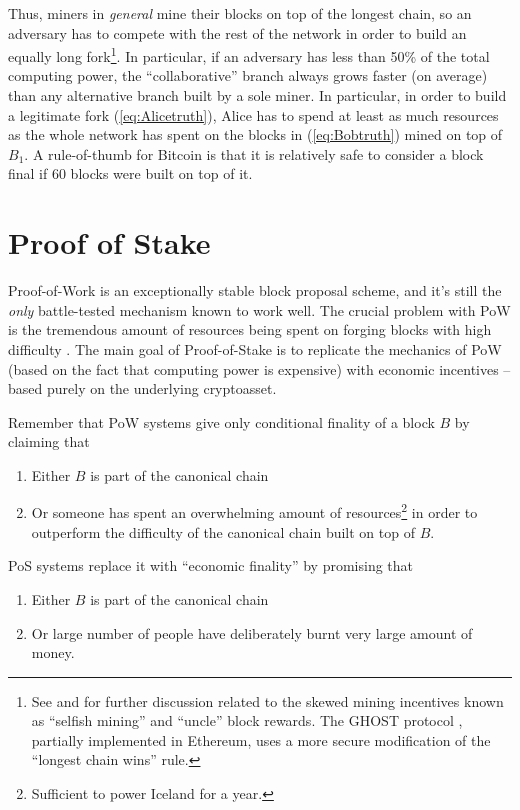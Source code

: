 \documentclass[a4paper]{article}
\begin{document}
 Thus, miners in \emph{general} mine their blocks on top of the longest chain, so an adversary has to compete with the rest of the network in order to build an equally long fork\footnote{See \cite{Eyal_Sirer_2018} and \cite{ButerinSecurityFrameworks} for further discussion related to the skewed mining incentives known as ``selfish mining'' and ``uncle'' block rewards. The GHOST protocol \cite{GHOST}, partially implemented in Ethereum, uses a more secure modification of the ``longest chain wins'' rule.}. In particular, if an adversary has less than 50\% of the total computing power, the ``collaborative'' branch always grows faster (on average) than any alternative branch built by a sole miner. In particular, in order to build a legitimate fork (\ref{eq:Alicetruth}), Alice has to spend at least as much resources as the whole network has spent on the blocks in (\ref{eq:Bobtruth}) mined on top of $B_1$. A rule-of-thumb for Bitcoin is that it is relatively safe to consider a block final if 60 blocks were built on top of it\cite{BitcoinConfirmation}.  
 
\section{Proof of Stake} \label{sec:PoS}

Proof-of-Work is an exceptionally stable block proposal scheme, and it's still the \emph{only} battle-tested mechanism known to work well. The crucial problem with PoW is the tremendous amount of resources being spent on forging blocks with high difficulty \cite{BitcoinEnergy}.    
   The main goal of Proof-of-Stake is to replicate the mechanics of PoW (based on the fact that computing power is expensive) with economic incentives -- based purely on the underlying cryptoasset.
 
  Remember that PoW systems give only conditional finality of a block $B$ by claiming that 
 \begin{enumerate}
    \item[(1)] Either $B$ is part of the canonical chain
    \item[(2)] Or someone has spent an overwhelming amount of resources\footnote{Sufficient to power Iceland for a year.} in order to outperform the difficulty of the canonical chain built on top of $B$.  
 \end{enumerate}

PoS systems replace it with ``economic finality'' by promising that \cite{PoSFAQ}
 \begin{enumerate}
    \item[(1)] Either $B$ is part of the canonical chain
    \item[(2)] Or large number of people have deliberately burnt very large amount of money.  
 \end{enumerate}
 
\end{document}

